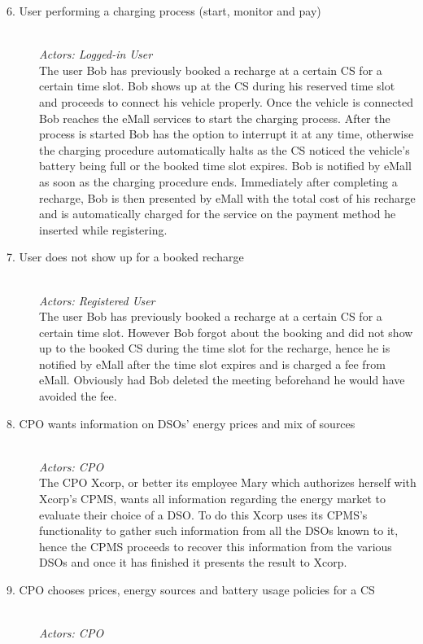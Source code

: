 \documentclass[11pt]{article}
\begin{document}
\begin{description}
    \item [6. User performing a charging process (start, monitor and pay)] \hfill \\
        \textit{Actors: Logged-in User} \\
        The user Bob has previously booked a recharge at a certain CS for a certain time slot. Bob shows up at the CS during his reserved time slot and proceeds to connect his vehicle properly. Once the vehicle is connected Bob reaches the eMall services to start the charging process. After the process is started Bob has the option to interrupt it at any time, otherwise the charging procedure automatically halts as the CS noticed the vehicle’s battery being full or the booked time slot expires. Bob is notified by eMall as soon as the charging procedure ends. Immediately after completing a recharge, Bob is then presented by eMall with the total cost of his recharge and is automatically charged for the service on the payment method he inserted while registering.
    \item [7. User does not show up for a booked recharge] \hfill \\
        \textit{Actors: Registered User} \\
        The user Bob has previously booked a recharge at a certain CS for a certain time slot. However Bob forgot about the booking and did not show up to the booked CS during the time slot for the recharge, hence he is notified by eMall after the time slot expires and is charged a fee from eMall. Obviously had Bob deleted the meeting beforehand he would have avoided the fee.
    \item [8. CPO wants information on DSOs’ energy prices and mix of sources] \hfill \\
        \textit{Actors: CPO} \\
        The CPO Xcorp, or better its employee Mary which authorizes herself with Xcorp's CPMS, wants all information regarding the energy market to evaluate their choice of a DSO. To do this Xcorp uses its CPMS’s functionality to gather such information from all the DSOs known to it, hence the CPMS proceeds to recover this information from the various DSOs and once it has finished it presents the result to Xcorp.
    \item [9. CPO chooses prices, energy sources and battery usage policies for a CS] \hfill \\
        \textit{Actors: CPO} \\

\end{description}
\end{document}
